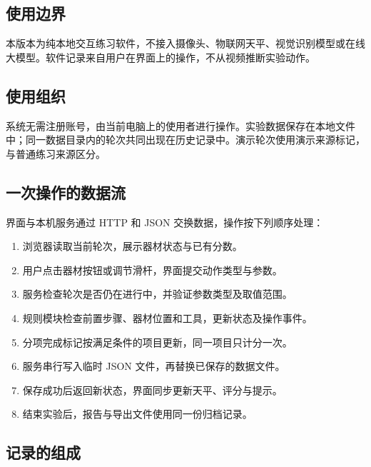 \documentclass[UTF8,fontset=windows,zihao=-4]{ctexart}
\begin{document}
\subsection{使用边界}

本版本为纯本地交互练习软件，不接入摄像头、物联网天平、视觉识别模型或在线大模型。软件记录来自用户在界面上的操作，不从视频推断实验动作。

\subsection{使用组织}

系统无需注册账号，由当前电脑上的使用者进行操作。实验数据保存在本地文件中；同一数据目录内的轮次共同出现在历史记录中。演示轮次使用演示来源标记，与普通练习来源区分。

\subsection{一次操作的数据流}

界面与本机服务通过 HTTP 和 JSON 交换数据，操作按下列顺序处理：

\begin{enumerate}

\item 浏览器读取当前轮次，展示器材状态与已有分数。

\item 用户点击器材按钮或调节滑杆，界面提交动作类型与参数。

\item 服务检查轮次是否仍在进行中，并验证参数类型及取值范围。

\item 规则模块检查前置步骤、器材位置和工具，更新状态及操作事件。

\item 分项完成标记按满足条件的项目更新，同一项目只计分一次。

\item 服务串行写入临时 JSON 文件，再替换已保存的数据文件。

\item 保存成功后返回新状态，界面同步更新天平、评分与提示。

\item 结束实验后，报告与导出文件使用同一份归档记录。

\end{enumerate}

\subsection{记录的组成}
\end{document}
